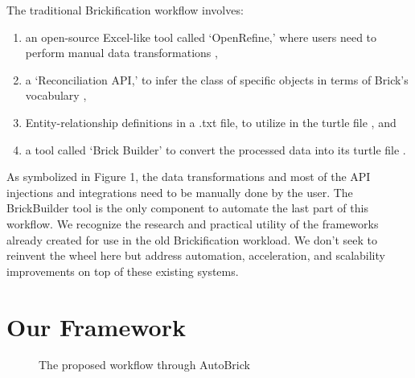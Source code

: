\documentclass[twocolumn, switch]{article} %
\begin{document}
The traditional Brickification workflow involves:
\begin{enumerate}
    \item an open-source Excel-like tool called ‘OpenRefine,’ where users need
        to perform manual data transformations
        \cite{gtfierro225_2020},
    \item a ‘Reconciliation API,’ to infer the class of specific objects in
        terms of Brick’s vocabulary \cite{brickschema},
    \item Entity-relationship definitions in a .txt file, to utilize in the
        turtle file \cite{gtfierro}, and
    \item a tool called ‘Brick Builder’ to convert the processed data into its
        turtle file \cite{brick_ttl_viewer}.
\end{enumerate}
As symbolized in Figure 1, the data transformations and most of the API injections and integrations need to be manually done by the user. The BrickBuilder tool is the only component to automate the last part of this workflow. We recognize the research and practical utility of the frameworks already created for use in the old Brickification workload. We don’t seek to reinvent the wheel here but address automation, acceleration, and scalability improvements on top of these existing systems.

\section{Our Framework}

\begin{figure}[H]
  \centering
  \caption{The proposed workflow through AutoBrick}
  \label{fig:fig2}
\end{figure}
\end{document}
